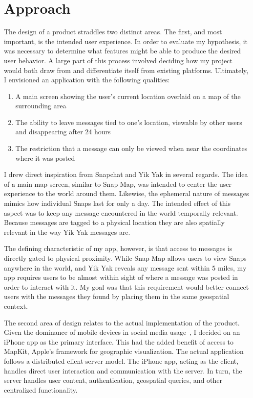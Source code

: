 \section{Approach}

The design of a product straddles two distinct areas. The first, and most important, is the intended user experience. In order to evaluate my hypothesis, it was necessary to determine what features might be able to produce the desired user behavior. A large part of this process involved deciding how my project would both draw from and differentiate itself from existing platforms. Ultimately, I envisioned an application with the following qualities:

\begin{enumerate}
    \item A main screen showing the user's current location overlaid on a map of the surrounding area
    \item The ability to leave messages tied to one's location, viewable by other users and disappearing after 24 hours
    \item The restriction that a message can only be viewed when near the coordinates where it was posted
\end{enumerate}

I drew direct inspiration from Snapchat and Yik Yak in several regards. The idea of a main map screen, similar to Snap Map, was intended to center the user experience to the world around them. Likewise, the ephemeral nature of messages mimics how individual Snaps last for only a day. The intended effect of this aspect was to keep any message encountered in the world temporally relevant. Because messages are tagged to a physical location they are also spatially relevant in the way Yik Yak messages are.

The defining characteristic of my app, however, is that access to messages is directly gated to physical proximity. While Snap Map allows users to view Snaps anywhere in the world, and Yik Yak reveals any message sent within 5 miles, my app requires users to be almost within sight of where a message was posted in order to interact with it. My goal was that this requirement would better connect users with the messages they found by placing them in the same geospatial context.

The second area of design relates to the actual implementation of the product. Given the dominance of mobile devices in social media usage~\cite{umaine_2021}, I decided on an iPhone app as the primary interface. This had the added benefit of access to \textsf{MapKit}, Apple's framework for geographic visualization. The actual application follows a distributed client-server model. The iPhone app, acting as the client, handles direct user interaction and communication with the server. In turn, the server handles user content, authentication, geospatial queries, and other centralized functionality.
